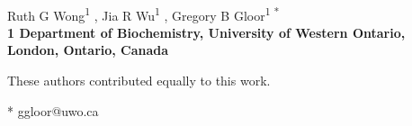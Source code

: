 \documentclass[10pt,letterpaper]{article}
\date{}
\begin{document}
\vspace*{0.35in}

\begin{flushleft}
{\Large
\textbf{}
}
\newline
\\
Ruth G Wong\textsuperscript{1 \Yinyang},
Jia R Wu\textsuperscript{1 \Yinyang},
Gregory B Gloor\textsuperscript{1 *}
\\
\bigskip
\bf{1} Department of Biochemistry, University of Western Ontario, London, Ontario, Canada
\\
\bigskip

% 
%
\Yinyang These authors contributed equally to this work.





* ggloor@uwo.ca

\end{flushleft}
\end{document}
